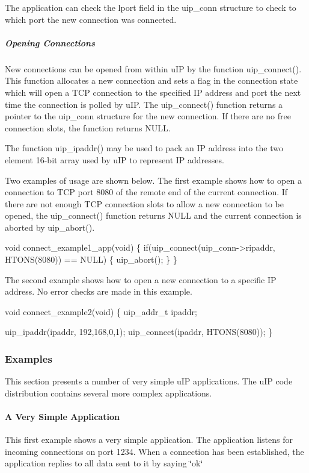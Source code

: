 The application can check the lport field in the uip\+\_\+conn structure to check to which port the new connection was connected.\hypertarget{a00074_connect}{}\subparagraph{Opening Connections}\label{a00074_connect}
New connections can be opened from within u\+IP by the function uip\+\_\+connect(). This function allocates a new connection and sets a flag in the connection state which will open a T\+CP connection to the specified IP address and port the next time the connection is polled by u\+IP. The uip\+\_\+connect() function returns a pointer to the uip\+\_\+conn structure for the new connection. If there are no free connection slots, the function returns N\+U\+LL.

The function uip\+\_\+ipaddr() may be used to pack an IP address into the two element 16-\/bit array used by u\+IP to represent IP addresses.

Two examples of usage are shown below. The first example shows how to open a connection to T\+CP port 8080 of the remote end of the current connection. If there are not enough T\+CP connection slots to allow a new connection to be opened, the uip\+\_\+connect() function returns N\+U\+LL and the current connection is aborted by uip\+\_\+abort().


\begin{DoxyCode}
\textcolor{keywordtype}{void} connect\_example1\_app(\textcolor{keywordtype}{void}) \{
   \textcolor{keywordflow}{if}(uip\_connect(uip\_conn->ripaddr, HTONS(8080)) == NULL) \{
      uip\_abort();
   \}
\}   
\end{DoxyCode}


The second example shows how to open a new connection to a specific IP address. No error checks are made in this example.


\begin{DoxyCode}
\textcolor{keywordtype}{void} connect\_example2(\textcolor{keywordtype}{void}) \{
   uip\_addr\_t ipaddr;

   uip\_ipaddr(ipaddr, 192,168,0,1);
   uip\_connect(ipaddr, HTONS(8080));
\}
\end{DoxyCode}
\hypertarget{a00074_examples}{}\subsubsection{Examples}\label{a00074_examples}
This section presents a number of very simple u\+IP applications. The u\+IP code distribution contains several more complex applications.\hypertarget{a00074_example1}{}\paragraph{A Very Simple Application}\label{a00074_example1}
This first example shows a very simple application. The application listens for incoming connections on port 1234. When a connection has been established, the application replies to all data sent to it by saying \char`\"{}ok\char`\"{}

